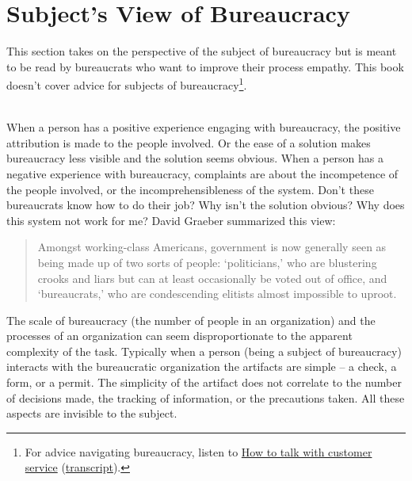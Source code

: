 \section{Subject's View of Bureaucracy\label{sec:subjects-view}}

This section takes on the perspective of the subject of bureaucracy but is meant to be read by bureaucrats who want to improve their \gls{process empathy}. This book doesn't cover advice for subjects of bureaucracy\footnote{For advice navigating bureaucracy, listen to  \href{https://www.npr.org/2022/03/16/1086915600/get-what-you-want-customer-service}{How to talk with customer service} (\href{https://www.npr.org/transcripts/1086915600}{transcript}).}.

\ \\

When a person has a positive experience engaging with bureaucracy, the positive attribution is made to the people involved. Or the ease of a solution makes bureaucracy less visible and the solution seems obvious. 
When a person has a negative experience with bureaucracy, complaints are about the incompetence of the people involved, or the incomprehensibleness of the system. Don't these bureaucrats know how to do their job? Why isn't the solution obvious? Why does this system not work for me? David Graeber summarized this view:
\begin{quote}
 Amongst working-class Americans, government is now generally seen as being made up of two sorts of people: `politicians,' who are blustering crooks and liars but can at least occasionally be voted out of office, and `bureaucrats,' who are condescending elitists almost impossible to uproot.   
\end{quote}


The scale of bureaucracy (the number of people in an organization) and the processes of an organization can seem disproportionate to the apparent complexity of the task. Typically when a person (being a subject of bureaucracy) interacts with the bureaucratic organization the artifacts are simple -- a check, a form, or a permit. The simplicity of the artifact does not correlate to the number of decisions made, the tracking of information, or the precautions taken. All these aspects are invisible to the subject.

